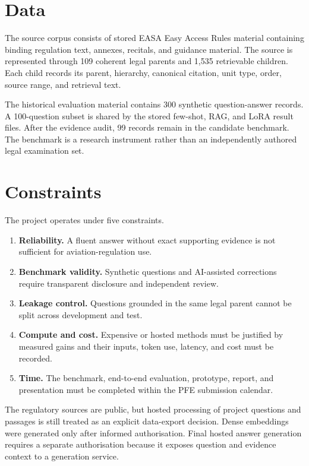\section{Data}

The source corpus consists of stored EASA Easy Access Rules material containing binding regulation text, annexes, recitals, and guidance material. The source is represented through 109 coherent legal parents and 1,535 retrievable children. Each child records its parent, hierarchy, canonical citation, unit type, order, source range, and retrieval text.

The historical evaluation material contains 300 synthetic question-answer records. A 100-question subset is shared by the stored few-shot, RAG, and LoRA result files. After the evidence audit, 99 records remain in the candidate benchmark. The benchmark is a research instrument rather than an independently authored legal examination set.

\section{Constraints}

The project operates under five constraints.

\begin{enumerate}
  \item \textbf{Reliability.} A fluent answer without exact supporting evidence is not sufficient for aviation-regulation use.
  \item \textbf{Benchmark validity.} Synthetic questions and AI-assisted corrections require transparent disclosure and independent review.
  \item \textbf{Leakage control.} Questions grounded in the same legal parent cannot be split across development and test.
  \item \textbf{Compute and cost.} Expensive or hosted methods must be justified by measured gains and their inputs, token use, latency, and cost must be recorded.
  \item \textbf{Time.} The benchmark, end-to-end evaluation, prototype, report, and presentation must be completed within the PFE submission calendar.
\end{enumerate}

The regulatory sources are public, but hosted processing of project questions and passages is still treated as an explicit data-export decision. Dense embeddings were generated only after informed authorisation. Final hosted answer generation requires a separate authorisation because it exposes question and evidence context to a generation service.

